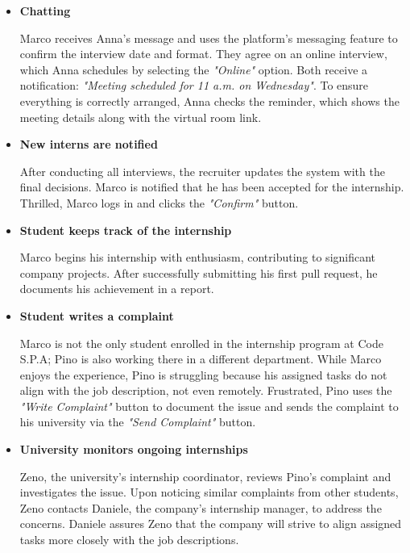 \begin{itemize}
    \item\textbf{ Chatting  }

          Marco receives Anna's message and uses the platform's messaging feature to confirm the interview date and format.  
          They agree on an online interview, which Anna schedules by selecting the \textit{"Online"} option.  
          Both receive a notification: \textit{"Meeting scheduled for 11 a.m. on Wednesday"}.  
          To ensure everything is correctly arranged, Anna checks the reminder, which shows the meeting details along with the virtual room link.

    \item\textbf{ New interns are notified  }

          After conducting all interviews, the recruiter updates the system with the final decisions.  
          Marco is notified that he has been accepted for the internship.  
          Thrilled, Marco logs in and clicks the \textit{"Confirm"} button.

    \item\textbf{ Student keeps track of the internship  }
    
          Marco begins his internship with enthusiasm, contributing to significant company projects.  
          After successfully submitting his first pull request, he documents his achievement in a report.

    \item\textbf{ Student writes a complaint  }
    
          Marco is not the only student enrolled in the internship program at Code S.P.A; Pino is also working there in a different department.  
          While Marco enjoys the experience, Pino is struggling because his assigned tasks do not align with the job description, not even remotely.  
          Frustrated, Pino uses the \textit{"Write Complaint"} button to document the issue and sends the complaint to his university via the \textit{"Send Complaint"} button.

    \item\textbf{ University monitors ongoing internships  }
    
          Zeno, the university's internship coordinator, reviews Pino's complaint and investigates the issue.  
          Upon noticing similar complaints from other students, Zeno contacts Daniele, the company's internship manager, to address the concerns.  
          Daniele assures Zeno that the company will strive to align assigned tasks more closely with the job descriptions.


\end{itemize}
